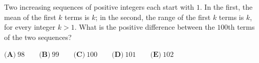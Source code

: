 Two increasing sequences of positive integers each start with $1$. In the first, the mean of the first $k$ terms is $k$; in the second, the range of the first $k$ terms is $k$, for every integer $k>1$. What is the positive difference between the $100$th terms of the two sequences?

$\textbf{(A)}\ 98\qquad\textbf{(B)}\ 99\qquad\textbf{(C)}\ 100\qquad\textbf{(D)}\ 101\qquad\textbf{(E)}\ 102$
